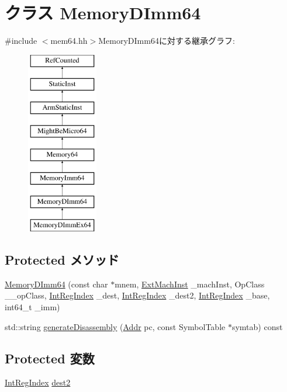 \hypertarget{classArmISA_1_1MemoryDImm64}{
\section{クラス MemoryDImm64}
\label{classArmISA_1_1MemoryDImm64}
}


{\ttfamily \#include $<$mem64.hh$>$}MemoryDImm64に対する継承グラフ:\begin{figure}[H]
\begin{center}
\leavevmode
\includegraphics[height=8cm]{classArmISA_1_1MemoryDImm64}
\end{center}
\end{figure}
\subsection*{Protected メソッド}
\begin{DoxyCompactItemize}
\item 
\hyperlink{classArmISA_1_1MemoryDImm64_a6ac32092cd0d3d2068f3f233791b3bca}{MemoryDImm64} (const char $\ast$mnem, \hyperlink{classStaticInst_a5605d4fc727eae9e595325c90c0ec108}{ExtMachInst} \_\-machInst, OpClass \_\-\_\-opClass, \hyperlink{namespaceArmISA_ae64680ba9fb526106829d6bf92fc791b}{IntRegIndex} \_\-dest, \hyperlink{namespaceArmISA_ae64680ba9fb526106829d6bf92fc791b}{IntRegIndex} \_\-dest2, \hyperlink{namespaceArmISA_ae64680ba9fb526106829d6bf92fc791b}{IntRegIndex} \_\-base, int64\_\-t \_\-imm)
\item 
std::string \hyperlink{classArmISA_1_1MemoryDImm64_a95d323a22a5f07e14d6b4c9385a91896}{generateDisassembly} (\hyperlink{classm5_1_1params_1_1Addr}{Addr} pc, const SymbolTable $\ast$symtab) const 
\end{DoxyCompactItemize}
\subsection*{Protected 変数}
\begin{DoxyCompactItemize}
\item 
\hyperlink{namespaceArmISA_ae64680ba9fb526106829d6bf92fc791b}{IntRegIndex} \hyperlink{classArmISA_1_1MemoryDImm64_a0425ad33e25c8198da341b8d8c01fcba}{dest2}
\end{DoxyCompactItemize}


